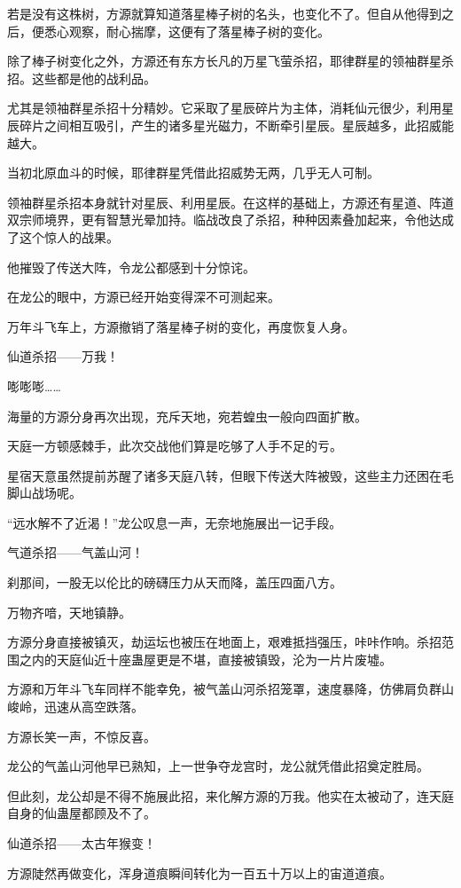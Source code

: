 \begin{this_body}
若是没有这株树，方源就算知道落星棒子树的名头，也变化不了。但自从他得到之后，便悉心观察，耐心揣摩，这便有了落星棒子树的变化。

除了棒子树变化之外，方源还有东方长凡的万星飞萤杀招，耶律群星的领袖群星杀招。这些都是他的战利品。

尤其是领袖群星杀招十分精妙。它采取了星辰碎片为主体，消耗仙元很少，利用星辰碎片之间相互吸引，产生的诸多星光磁力，不断牵引星辰。星辰越多，此招威能越大。

当初北原血斗的时候，耶律群星凭借此招威势无两，几乎无人可制。

领袖群星杀招本身就针对星辰、利用星辰。在这样的基础上，方源还有星道、阵道双宗师境界，更有智慧光晕加持。临战改良了杀招，种种因素叠加起来，令他达成了这个惊人的战果。

他摧毁了传送大阵，令龙公都感到十分惊诧。

在龙公的眼中，方源已经开始变得深不可测起来。

万年斗飞车上，方源撤销了落星棒子树的变化，再度恢复人身。

仙道杀招——万我！

嘭嘭嘭……

海量的方源分身再次出现，充斥天地，宛若蝗虫一般向四面扩散。

天庭一方顿感棘手，此次交战他们算是吃够了人手不足的亏。

星宿天意虽然提前苏醒了诸多天庭八转，但眼下传送大阵被毁，这些主力还困在毛脚山战场呢。

“远水解不了近渴！”龙公叹息一声，无奈地施展出一记手段。

气道杀招——气盖山河！

刹那间，一股无以伦比的磅礴压力从天而降，盖压四面八方。

万物齐喑，天地镇静。

方源分身直接被镇灭，劫运坛也被压在地面上，艰难抵挡强压，咔咔作响。杀招范围之内的天庭仙近十座蛊屋更是不堪，直接被镇毁，沦为一片片废墟。

方源和万年斗飞车同样不能幸免，被气盖山河杀招笼罩，速度暴降，仿佛肩负群山峻岭，迅速从高空跌落。

方源长笑一声，不惊反喜。

龙公的气盖山河他早已熟知，上一世争夺龙宫时，龙公就凭借此招奠定胜局。

但此刻，龙公却是不得不施展此招，来化解方源的万我。他实在太被动了，连天庭自身的仙蛊屋都顾及不了。

仙道杀招——太古年猴变！

方源陡然再做变化，浑身道痕瞬间转化为一百五十万以上的宙道道痕。


\end{this_body}
